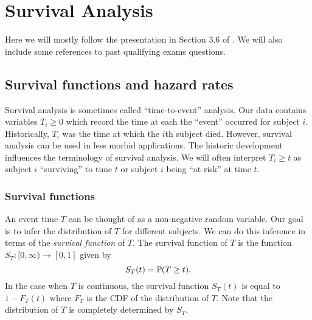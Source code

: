 \section{Survival Analysis}

Here we will mostly follow the presentation in Section 3.6 of \citep{efron_2022}. We will also include some references to past qualifying exams questions.

\subsection{Survival functions and hazard rates}

Survival analysis is sometimes called ``time-to-event'' analysis. Our data contains variables $T_i \ge 0$ which record the time at each the ``event'' occurred for subject $i$. Historically, $T_i$ was the time at which the $i$th subject died. However, survival analysis can be used in less morbid applications. The historic development influences the terminology of survival analysis. We will often interpret $T_i \ge t$ as subject $i$ ``surviving'' to time $t$ or subject $i$ being ``at risk'' at time $t$.


\subsubsection*{Survival functions}
An event time $T$ can be thought of as a non-negative random variable. Our goal is to infer the distribution of $T$ for different subjects. We can do this inference in terms of the \emph{survival function} of $T$. The survival function of $T$ is the function $S_T:[0,\infty) \to [0,1]$ given by
\[
    S_T(t) = {\mathbb P}(T \ge t).    
\]
In the case when $T$ is continuous, the survival function $S_T(t)$ is equal to $1-F_T(t)$ where $F_T$ is the CDF of the distribution of $T$. Note that the distribution of $T$ is completely determined by $S_T$. 


